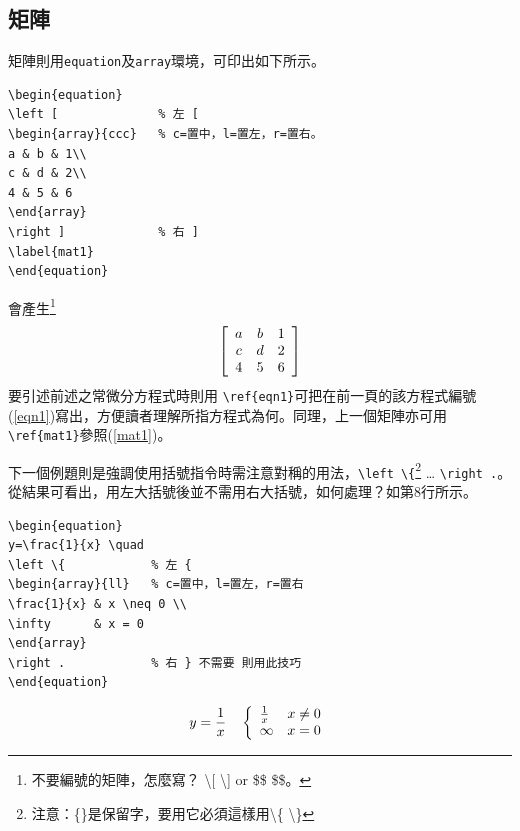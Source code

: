 \subsection{矩陣}
矩陣則用{\tt equation}及{\tt array}環境，可印出如下所示。
\begin{Verbatim}[frame=single,firstline=1,label=Every matrix]
\begin{equation}
\left [              % 左 [
\begin{array}{ccc}   % c=置中，l=置左，r=置右。
a & b & 1\\
c & d & 2\\
4 & 5 & 6
\end{array}
\right ]             % 右 ]
\label{mat1}
\end{equation}
\end{Verbatim}
會產生\footnote{不要編號的矩陣，怎麼寫？  \textbackslash [ \textbackslash ] or \$\$ \$\$。} 
\begin{equation}
\left [
\begin{array}{ccc}  \index{\LaTeX環境!array}
a & b & 1\\
c & d & 2\\
4 & 5 & 6
\end{array}
\right ]
\label{mat1} \index{\LaTeX!\textbackslash label}\index{\LaTeX!\textbackslash ref}
\end{equation}
要引述前述之常微分方程式時則用 \verb|\ref{eqn1}|可把在前一頁的該方程式編號(\ref{eqn1})寫出，方便讀者理解所指方程式為何。同理，上一個矩陣亦可用\verb|\ref{mat1}|參照(\ref{mat1})。

下一個例題則是強調使用括號指令時需注意對稱的用法，\verb|\left \{|\footnote{注意：\{\}是保留字，要用它必須這樣用\textbackslash \{ \textbackslash \}} \ldots
\verb|\right .|。從結果可看出，用左大括號後並不需用右大括號，如何處理？如第8行所示。

\begin{Verbatim}[frame=single,firstline=1,label=Pairs]
\begin{equation}
y=\frac{1}{x} \quad  
\left \{            % 左 {
\begin{array}{ll}   % c=置中，l=置左，r=置右
\frac{1}{x} & x \neq 0 \\  
\infty      & x = 0
\end{array}
\right .            % 右 } 不需要 則用此技巧
\end{equation}
\end{Verbatim}
\begin{equation}
y=\frac{1}{x} \quad  \index{\LaTeX!\textbackslash quad}
\left \{
\begin{array}{ll}   
\frac{1}{x} & x \neq 0 \\
\infty      & x = 0  \index{\LaTeX!\textbackslash neq}
\end{array}
\right .            
\end{equation}
